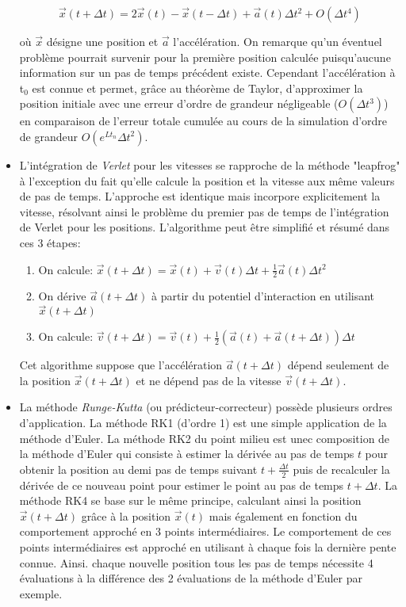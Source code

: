 \begin{itemize}
	$$\overrightarrow{x}(t +\Delta t) = 2\overrightarrow{x}(t) - \overrightarrow{x}(t - \Delta t) + \overrightarrow{a}(t)\Delta t^2 + O(\Delta t^4)$$ 

	où $\overrightarrow{x}$ désigne une position et $\overrightarrow{a}$ l'accélération.
	On remarque qu'un éventuel problème pourrait survenir pour la première position calculée puisqu'aucune information sur un pas de temps précédent existe. Cependant l'accélération à t$_0$ est connue et permet, grâce au théorème de Taylor, d'approximer la position initiale avec une erreur d'ordre de grandeur négligeable ($O(\Delta t^3)$) en comparaison de l'erreur totale cumulée au cours de la simulation d'ordre de grandeur $O(e^{Lt_n}\Delta t^2)$.
	\item L'intégration de \textit{Verlet} pour les vitesses se rapproche de la méthode "leapfrog" à l'exception du fait qu'elle calcule la position et la vitesse aux même valeurs de pas de temps. L'approche est identique mais incorpore explicitement la vitesse, résolvant ainsi le problème du premier pas de temps de l'intégration de Verlet pour les positions. L'algorithme peut être simplifié et résumé dans ces 3 étapes:
	\begin{enumerate}
		\item On calcule: $\overrightarrow{x}(t+\Delta t) = \overrightarrow{x}(t) + \overrightarrow{v}(t)\Delta t + \frac{1}{2}\overrightarrow{a}(t)\Delta t^2$
		\item On dérive $\overrightarrow{a}(t+\Delta t)$ à partir du potentiel d'interaction en utilisant $\overrightarrow{x}(t+\Delta t)$
		\item On calcule: $\overrightarrow{v}(t+\Delta t) = \overrightarrow{v}(t) + \frac{1}{2} (\overrightarrow{a}(t) + \overrightarrow{a}(t+\Delta t))\Delta t$
	\end{enumerate}
	Cet algorithme suppose que l'accélération $\overrightarrow{a}(t+\Delta t)$ dépend seulement de la position $\overrightarrow{x}(t+\Delta t)$ et ne dépend pas de la vitesse $\overrightarrow{v}(t+\Delta t)$.
	\item La méthode \textit{Runge-Kutta} (ou prédicteur-correcteur) possède plusieurs ordres d'application. La méthode RK1 (d'ordre 1) est une simple application de la méthode d'Euler. La méthode RK2 du point milieu est unec composition de la méthode d'Euler qui consiste à estimer la dérivée au pas de temps $t$ pour obtenir la position au demi pas de temps suivant $t+\frac{\Delta t}{2}$ puis de recalculer la dérivée de ce nouveau point pour estimer le point au pas de temps $t+\Delta t$. La méthode RK4 se base sur le même principe, calculant ainsi la position $\overrightarrow{x}(t+\Delta t)$ grâce à la position $\overrightarrow{x}(t)$ mais également en fonction du comportement approché en 3 points intermédiaires. Le comportement de ces points intermédiaires est approché en utilisant à chaque fois la dernière pente connue. Ainsi. chaque nouvelle position tous les pas de temps nécessite 4 évaluations à la différence des 2 évaluations de la méthode d'Euler par exemple.
\end{itemize}


